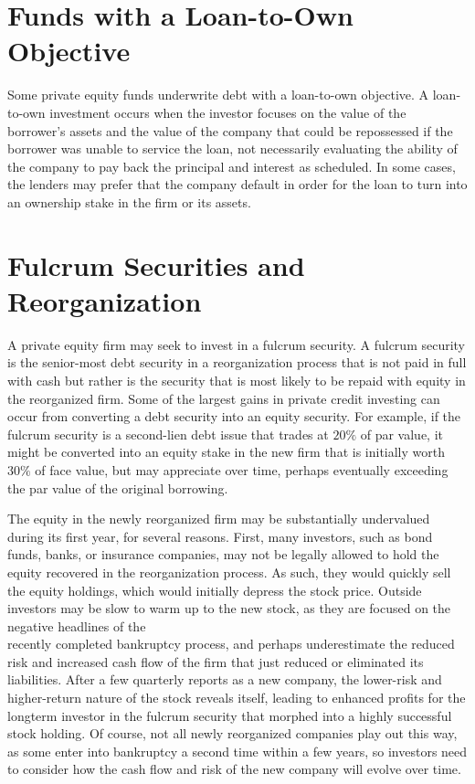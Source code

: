 \documentclass[11pt]{article}
\begin{document}
\section*{Funds with a Loan-to-Own Objective}
Some private equity funds underwrite debt with a loan-to-own objective. A loan-to-own investment occurs when the investor focuses on the value of the borrower's assets and the value of the company that could be repossessed if the borrower was unable to service the loan, not necessarily evaluating the ability of the company to pay back the principal and interest as scheduled. In some cases, the lenders may prefer that the company default in order for the loan to turn into an ownership stake in the firm or its assets.

\section*{Fulcrum Securities and Reorganization}
A private equity firm may seek to invest in a fulcrum security. A fulcrum security is the senior-most debt security in a reorganization process that is not paid in full with cash but rather is the security that is most likely to be repaid with equity in the reorganized firm. Some of the largest gains in private credit investing can occur from converting a debt security into an equity security. For example, if the fulcrum security is a second-lien debt issue that trades at $20 \%$ of par value, it might be converted into an equity stake in the new firm that is initially worth $30 \%$ of face value, but may appreciate over time, perhaps eventually exceeding the par value of the original borrowing.

The equity in the newly reorganized firm may be substantially undervalued during its first year, for several reasons. First, many investors, such as bond funds, banks, or insurance companies, may not be legally allowed to hold the equity recovered in the reorganization process. As such, they would quickly sell the equity holdings, which would initially depress the stock price. Outside investors may be slow to warm up to the new stock, as they are focused on the negative headlines of the\\
recently completed bankruptcy process, and perhaps underestimate the reduced risk and increased cash flow of the firm that just reduced or eliminated its liabilities. After a few quarterly reports as a new company, the lower-risk and higher-return nature of the stock reveals itself, leading to enhanced profits for the longterm investor in the fulcrum security that morphed into a highly successful stock holding. Of course, not all newly reorganized companies play out this way, as some enter into bankruptcy a second time within a few years, so investors need to consider how the cash flow and risk of the new company will evolve over time.
\end{document}
